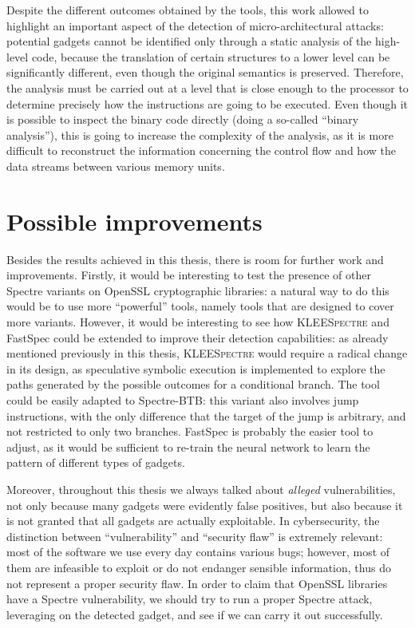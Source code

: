 \documentclass[target=mst,aauheader=aics]{thud}
\theoremstyle{definition}
\begin{document}
	Despite the different outcomes obtained by the tools, this work allowed to highlight an important aspect of the detection of micro-architectural attacks: potential gadgets cannot be identified only through a static analysis of the high-level code, because the translation of certain structures to a lower level can be significantly different, even though the original semantics is preserved. Therefore, the analysis must be carried out at a level that is close enough to the processor to determine precisely how the instructions are going to be executed. Even though it is possible to inspect the binary code directly (doing a so-called ``binary analysis''), this is going to increase the complexity of the analysis, as it is more difficult to reconstruct the information concerning the control flow and how the data streams between various memory units.
	
	\section{Possible improvements}
	Besides the results achieved in this thesis, there is room for further work and improvements. Firstly, it would be interesting to test the presence of other Spectre variants on OpenSSL cryptographic libraries: a natural way to do this would be to use more ``powerful'' tools, namely tools that are designed to cover more variants. However, it would be interesting to see how \textsc{KLEESpectre} and FastSpec could be extended to improve their detection capabilities: as already mentioned previously in this thesis, \textsc{KLEESpectre} would require a radical change in its design, as speculative symbolic execution is implemented to explore the paths generated by the possible outcomes for a conditional branch. The tool could be easily adapted to Spectre-BTB: this variant also involves jump instructions, with the only difference that the target of the jump is arbitrary, and not restricted to only two branches. FastSpec is probably the easier tool to adjust, as it would be sufficient to re-train the neural network to learn the pattern of different types of gadgets.
	
	Moreover, throughout this thesis we always talked about \textit{alleged} vulnerabilities, not only because many gadgets were evidently false positives, but also because it is not granted that all gadgets are actually exploitable. In cybersecurity, the distinction between ``vulnerability'' and ``security flaw'' is extremely relevant: most of the software we use every day contains various bugs; however, most of them are infeasible to exploit or do not endanger sensible information, thus do not represent a proper security flaw. In order to claim that OpenSSL libraries have a Spectre vulnerability, we should try to run a proper Spectre attack, leveraging on the detected gadget, and see if we can carry it out successfully.
    
\end{document}
